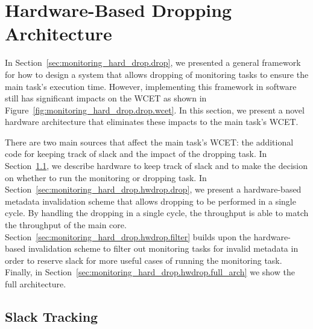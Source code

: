 \section{Hardware-Based Dropping Architecture}
\label{sec:monitoring_hard_drop.hwdrop}

In Section~\ref{sec:monitoring_hard_drop.drop}, we presented a general
framework for how to design a system that allows dropping of monitoring tasks
to ensure the main task's execution time. However, implementing this framework
in software still has significant impacts on the WCET as shown in
Figure~\ref{fig:monitoring_hard_drop.drop.wcet}.  In this section, we present a
novel hardware architecture that eliminates these impacts to the main task's
WCET.

There are two main sources that affect the main task's WCET: the additional
code for keeping track of slack and the impact of the dropping task.  In
Section~\ref{sec:monitoring_hard_drop.hwdrop.slack}, we describe hardware to
keep track of slack and to make the decision on whether to run the monitoring
or dropping task.  In Section~\ref{sec:monitoring_hard_drop.hwdrop.drop}, we
present a hardware-based metadata invalidation scheme that allows dropping to
be performed in a single cycle.  By handling the dropping in a single cycle,
the throughput is able to match the throughput of the main core.
Section~\ref{sec:monitoring_hard_drop.hwdrop.filter} builds upon the
hardware-based invalidation scheme to filter out monitoring tasks for invalid
metadata in order to reserve slack for more useful cases of running the
monitoring task. Finally, in
Section~\ref{sec:monitoring_hard_drop.hwdrop.full_arch} we show the full
architecture.

\subsection{Slack Tracking}
\label{sec:monitoring_hard_drop.hwdrop.slack}

